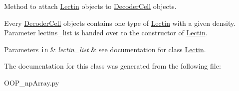 Method to attach \mbox{\hyperlink{class_o_o_p__np_array_1_1_lectin}{Lectin}} objects to \mbox{\hyperlink{class_o_o_p__np_array_1_1_decoder_cell}{Decoder\+Cell}} objects. 

Every \mbox{\hyperlink{class_o_o_p__np_array_1_1_decoder_cell}{Decoder\+Cell}} objects contains one type of \mbox{\hyperlink{class_o_o_p__np_array_1_1_lectin}{Lectin}} with a given density. Parameter lectins\+\_\+list is handed over to the constructor of \mbox{\hyperlink{class_o_o_p__np_array_1_1_lectin}{Lectin}}.


\begin{DoxyParams}[1]{Parameters}
\mbox{\tt in}  & {\em lectin\+\_\+list} & see documentation for class \mbox{\hyperlink{class_o_o_p__np_array_1_1_lectin}{Lectin}}. \\
\hline
\end{DoxyParams}


The documentation for this class was generated from the following file\+:\begin{DoxyCompactItemize}
\item 
O\+O\+P\+\_\+np\+Array.\+py\end{DoxyCompactItemize}
